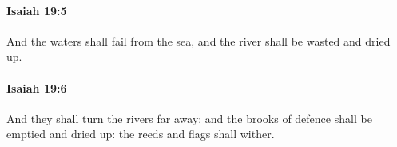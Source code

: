 		\paragraph{Isaiah 19:5} %
			\label{ISAIAH-19-5}

			And the waters shall fail from the sea, and the river shall be wasted and dried up.


		\paragraph{Isaiah 19:6} %
			\label{ISAIAH-19-6}

			And they shall turn the rivers far away; and the brooks of defence shall be emptied and dried up: the reeds and flags shall wither.


